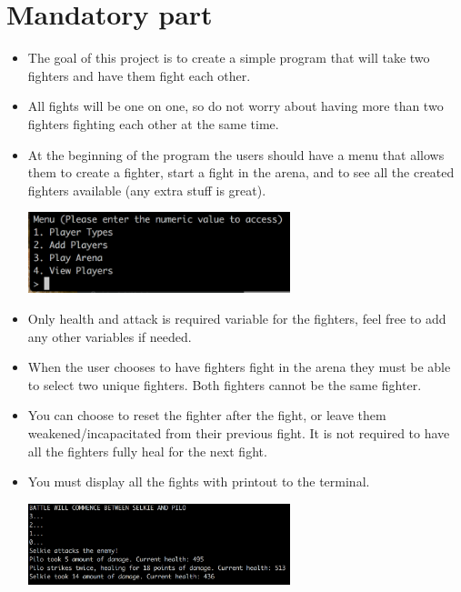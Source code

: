 \documentclass{42-en}
\begin{document}
\chapter{Mandatory part}


	\begin{itemize}
		\item The goal of this project is to create a simple program
		that will take two fighters and have them fight each other.
		\item All fights will be one on one, so do not worry about having
		more than two fighters fighting each other at the same time.
		\item At the beginning of the program the users should have a menu
		that allows them to create a fighter, start a fight in the arena,
		and to see all the created fighters available (any extra stuff is great).

	\begin{center}
		\includegraphics[width=0.6\textwidth]{images/menu.png}
	\end{center}

		\item Only health and attack is required variable for the fighters,
		feel free to add any other variables if needed.
		\item When the user chooses to have fighters fight in the arena
		they must be able to select two unique fighters. Both fighters cannot
		be the same fighter.
		\item You can choose to reset the fighter after the fight, or leave
		them weakened/incapacitated from their previous fight. It is not required
		to have all the fighters fully heal for the next fight.
		\item You must display all the fights with printout to the terminal.

	\begin{center}
		\includegraphics[width=0.6\textwidth]{images/fight.png}
	\end{center}


\end{itemize}
\end{document}
